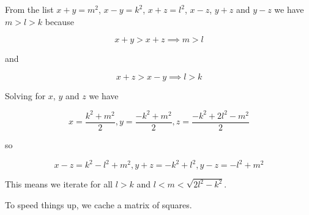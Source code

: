 \documentclass[12pt]{scrartcl}
\begin{document}
From the list $x+y=m^2$, $x-y=k^2$, $x+z=l^2$, $x-z$, $y+z$ and $y-z$ we have $m>l>k$ because

$$x+y>x+z \implies m>l$$

and

$$x+z>x-y\implies l>k$$

Solving for $x$, $y$ and $z$ we have

$$x=\frac{k^2 + m^2}{2}, y=\frac{-k^2 + m^2}{2},z= \frac{-k^2 + 2 l^2 - m^2}{2}$$


so

$$x-z=k^2 - l^2 + m^2, y+z=-k^2 + l^2, y-z=-l^2 + m^2$$

This means we iterate for all $l>k$ and $l<m<\sqrt{2 l^2-k^2}$.

To speed things up, we cache a matrix of squares.
\end{document}
